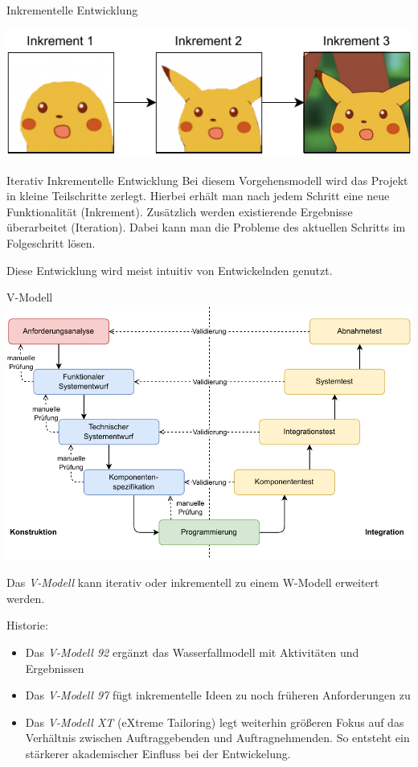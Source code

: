 \begin{example}{Inkrementelle Entwicklung}
    \begin{center}
        \includegraphics{includes/figures/01_incremental_development_example.pdf}
    \end{center}
\end{example}

\begin{defi}{Iterativ Inkrementelle Entwicklung}
    Bei diesem Vorgehensmodell wird das Projekt in kleine Teilschritte zerlegt.
    Hierbei erhält man nach jedem Schritt eine neue Funktionalität (Inkrement).
    Zusätzlich werden existierende Ergebnisse überarbeitet (Iteration).
    Dabei kann man die Probleme des aktuellen Schritts im Folgeschritt lösen.

    Diese Entwicklung wird meist intuitiv von Entwickelnden genutzt.
\end{defi}

\begin{defi}{V-Modell}
    \includegraphics[width=\textwidth]{includes/figures/01_v_model.pdf}

    Das \emph{V-Modell} kann iterativ oder inkrementell zu einem W-Modell erweitert werden.

    Historie:
    \begin{itemize}
        \item Das \emph{V-Modell 92} ergänzt das Wasserfallmodell mit Aktivitäten und Ergebnissen
        \item Das \emph{V-Modell 97} fügt inkrementelle Ideen zu noch früheren Anforderungen zu
        \item Das \emph{V-Modell XT} (eXtreme Tailoring) legt weiterhin größeren Fokus auf das Verhältnis zwischen Auftraggebenden und Auftragnehmenden.
              So entsteht ein stärkerer akademischer Einfluss bei der Entwickelung.
    \end{itemize}
\end{defi}

